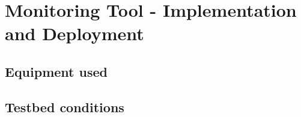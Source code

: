 
\chapter{Monitoring Tool - Implementation and Deployment} %

\label{Chapter5} %



\section{Equipment used}



\section{Testbed conditions}
